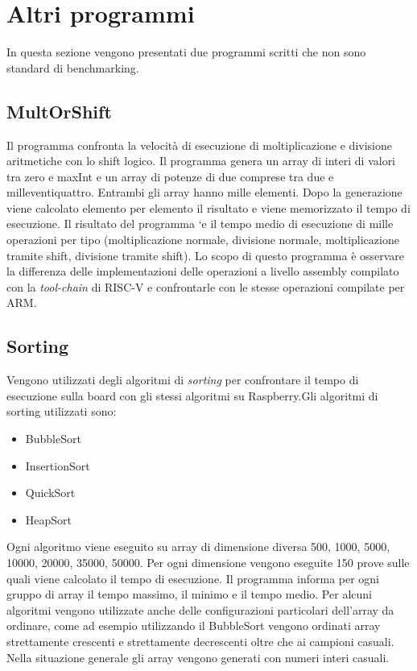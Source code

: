 \documentclass[12pt, a4paper]{report}
\begin{document}

\section{Altri programmi} 

In questa sezione vengono presentati due programmi scritti che non sono standard di benchmarking. 


\subsection{MultOrShift}
	Il programma confronta la velocità di esecuzione di moltiplicazione e divisione
aritmetiche con lo shift logico. Il programma genera un array di interi di
valori tra zero e maxInt e un array di potenze di due comprese tra due e
milleventiquattro. Entrambi gli array hanno mille elementi. Dopo la generazione
viene calcolato elemento per elemento il risultato e viene memorizzato il
tempo di esecuzione. Il risultato del programma `e il tempo medio di esecuzione
di mille operazioni per tipo (moltiplicazione normale, divisione normale, 
moltiplicazione tramite shift, divisione tramite shift). 
Lo scopo di questo programma è osservare la differenza delle implementazioni delle operazioni a livello assembly compilato con la \textit{tool-chain} di RISC-V e confrontarle con le stesse operazioni compilate per ARM.
		
		
\subsection{Sorting}
Vengono utilizzati degli algoritmi di \textit{sorting} per confrontare il tempo di esecuzione sulla board con gli stessi algoritmi su Raspberry.Gli algoritmi di sorting utilizzati sono:
\begin{itemize}
	\item BubbleSort
	\item InsertionSort
	\item QuickSort
	\item HeapSort
\end{itemize}

Ogni algoritmo viene eseguito su array di dimensione diversa 500, 1000, 5000, 10000, 20000, 35000, 50000. Per ogni dimensione vengono eseguite 150 prove sulle quali viene calcolato il tempo di esecuzione. Il programma informa per ogni gruppo di array il tempo massimo, il minimo e il tempo medio. Per alcuni algoritmi vengono utilizzate anche delle configurazioni particolari dell'array da ordinare, come ad esempio utilizzando il BubbleSort vengono ordinati array strettamente crescenti e strettamente decrescenti oltre che ai campioni casuali. Nella situazione generale gli array vengono generati con numeri interi casuali.
\end{document}

